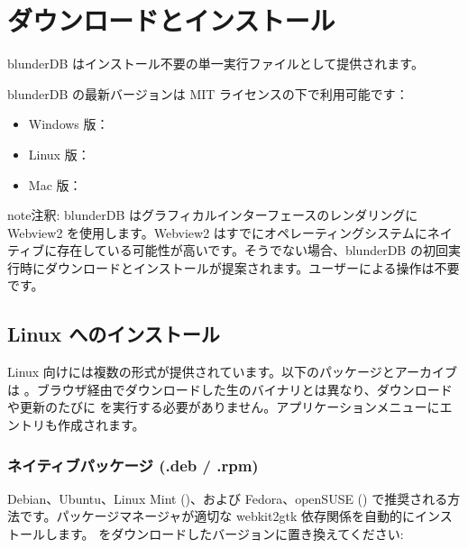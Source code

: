 \documentclass[letterpaper,10pt,dvipdfmx]{sphinxmanual}
\begin{document}
\section{ダウンロードとインストール}
\label{\detokenize{telecharge_install:telechargement-et-installation}}\label{\detokenize{telecharge_install:telecharge-install}}\label{\detokenize{telecharge_install::doc}}
\sphinxAtStartPar
blunderDB はインストール不要の単一実行ファイルとして提供されます。

\sphinxAtStartPar
blunderDB の最新バージョンは MIT ライセンスの下で利用可能です：
\begin{itemize}
\item {} 
\sphinxAtStartPar
Windows 版：

\item {} 
\sphinxAtStartPar
Linux 版：

\item {} 
\sphinxAtStartPar
Mac 版：

\end{itemize}

\begin{sphinxadmonition}{note}{注釈:}
\sphinxAtStartPar
blunderDB はグラフィカルインターフェースのレンダリングに Webview2 を使用します。Webview2 はすでにオペレーティングシステムにネイティブに存在している可能性が高いです。そうでない場合、blunderDB の初回実行時にダウンロードとインストールが提案されます。ユーザーによる操作は不要です。
\end{sphinxadmonition}


\subsection{Linux へのインストール}
\label{\detokenize{telecharge_install:installation-sous-linux}}
\sphinxAtStartPar
Linux 向けには複数の形式が提供されています。以下のパッケージとアーカイブは 。ブラウザ経由でダウンロードした生のバイナリとは異なり、ダウンロードや更新のたびに  を実行する必要がありません。アプリケーションメニューにエントリも作成されます。


\subsubsection{ネイティブパッケージ (.deb / .rpm)}
\label{\detokenize{telecharge_install:paquets-natifs-deb-rpm}}
\sphinxAtStartPar
Debian、Ubuntu、Linux Mint ()、および Fedora、openSUSE () で推奨される方法です。パッケージマネージャが適切な webkit2gtk 依存関係を自動的にインストールします。 をダウンロードしたバージョンに置き換えてください:
\end{document}
